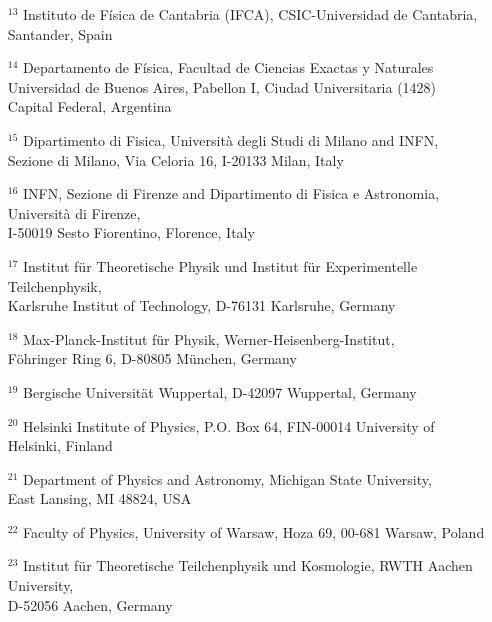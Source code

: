 \begin{itemize}
\item[$^{13}$] 
  Instituto de F\'isica de Cantabria (IFCA), CSIC-Universidad de
  Cantabria, \\
  Santander, Spain

\item[$^{14}$] 
  Departamento de F\'isica, Facultad de Ciencias Exactas y Naturales\\ 
  Universidad de Buenos Aires, 
  Pabellon I, Ciudad Universitaria (1428) \\
  Capital Federal, Argentina 

\item[$^{15}$] 
  Dipartimento di Fisica, Universit\`a degli Studi di Milano and
  INFN,\\ Sezione di Milano, Via Celoria 16, I-20133 Milan, Italy

\item[$^{16}$] 
  INFN, Sezione di Firenze and Dipartimento di Fisica e Astronomia, Universit\`a di Firenze,\\
  I-50019 Sesto Fiorentino, Florence, Italy 

\item[$^{17}$] 
  Institut f\"ur Theoretische Physik und Institut f\"ur Experimentelle
  Teilchenphysik, \\ 
  Karlsruhe Institut of Technology, D-76131 Karlsruhe, Germany

\item[$^{18}$] 
  Max-Planck-Institut f\"ur Physik, Werner-Heisenberg-Institut,\\
  F\"ohringer Ring 6, D-80805 M\"unchen, Germany

\item[$^{19}$] 
  Bergische Universit\"at Wuppertal, D-42097 Wuppertal, Germany  

\item[$^{20}$] 
  Helsinki Institute of Physics, P.O. Box 64, FIN-00014 University of Helsinki, Finland

\item[$^{21}$] 
  Department of Physics and Astronomy, Michigan State University, \\
  East Lansing, MI 48824, USA

\item[$^{22}$] 
  Faculty of Physics, University of Warsaw, Hoza 69, 00-681 Warsaw, Poland 

\item[$^{23}$] 
 Institut f\"ur Theoretische Teilchenphysik und Kosmologie,
 RWTH Aachen University, \\
 D-52056 Aachen, Germany 


\end{itemize}

